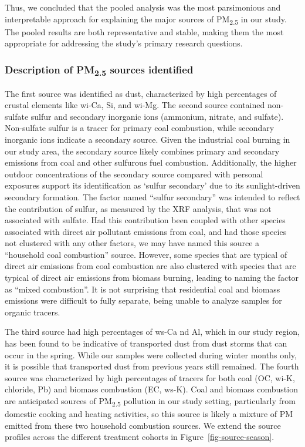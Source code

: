 \documentclass[
  letterpaper,
  DIV=11,
  numbers=noendperiod]{scrartcl}
\begin{document}
Thus, we concluded that the pooled analysis was the most parsimonious
and interpretable approach for explaining the major sources of
PM\textsubscript{2.5} in our study. The pooled results are both
representative and stable, making them the most appropriate for
addressing the study's primary research questions.

\subsubsection{\texorpdfstring{Description of PM\textsubscript{2.5}
sources
identified}{Description of PM2.5 sources identified}}\label{description-of-pm2.5-sources-identified}

The first source was identified as dust, characterized by high
percentages of crustal elements like wi-Ca, Si, and wi-Mg. The second
source contained non-sulfate sulfur and secondary inorganic ions
(ammonium, nitrate, and sulfate). Non-sulfate sulfur is a tracer for
primary coal combustion, while secondary inorganic ions indicate a
secondary source. Given the industrial coal burning in our study area,
the secondary source likely combines primary and secondary emissions
from coal and other sulfurous fuel combustion. Additionally, the higher
outdoor concentrations of the secondary source compared with personal
exposures support its identification as `sulfur secondary' due to its
sunlight-driven secondary formation. The factor named ``sulfur
secondary'' was intended to reflect the contribution of sulfur, as
measured by the XRF analysis, that was not associated with sulfate. Had
this contribution been coupled with other species associated with direct
air pollutant emissions from coal, and had those species not clustered
with any other factors, we may have named this source a ``household coal
combustion'' source. However, some species that are typical of direct
air emissions from coal combustion are also clustered with species that
are typical of direct air emissions from biomass burning, leading to
naming the factor as ``mixed combustion''. It is not surprising that
residential coal and biomass emissions were difficult to fully separate,
being unable to analyze samples for organic tracers.

The third source had high percentages of ws-Ca nd Al, which in our study
region, has been found to be indicative of transported dust from dust
storms that can occur in the spring. While our samples were collected
during winter months only, it is possible that transported dust from
previous years still remained. The fourth source was characterized by
high percentages of tracers for both coal (OC, wi-K, chloride, Pb) and
biomass combustion (EC, ws-K). Coal and biomass combustion are
anticipated sources of PM\textsubscript{2.5} pollution in our study
setting, particularly from domestic cooking and heating activities, so
this source is likely a mixture of PM emitted from these two household
combustion sources. We extend the source profiles across the different
treatment cohorts in Figure~\ref{fig-source-season}.
\end{document}
